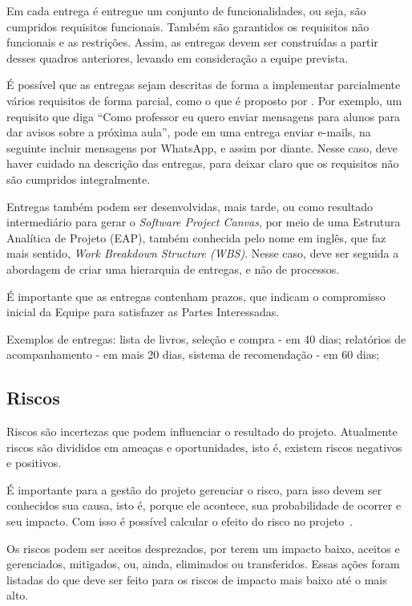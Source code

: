 \documentclass[a4]{report}
\begin{document}
Em cada entrega é entregue um conjunto de funcionalidades, ou seja, são cumpridos requisitos funcionais. Também são garantidos os requisitos não funcionais e as restrições. Assim, as entregas devem ser construídas a partir desses quadros anteriores, levando em consideração a equipe prevista.

É possível que as entregas sejam descritas de forma a implementar parcialmente vários requisitos de forma parcial, como o que é proposto por \citet{jacobson:2011:uc2p0}. Por exemplo, um requisito que diga ``Como professor eu quero enviar mensagens para alunos para dar avisos sobre a próxima aula'', pode em uma entrega enviar e-mails, na seguinte incluir mensagens por WhatsApp, e assim por diante. Nesse caso, deve haver cuidado na descrição das entregas, para deixar claro que os requisitos não são cumpridos integralmente.

Entregas também podem ser desenvolvidas, mais tarde, ou como resultado intermediário para gerar o \textit{Software Project Canvas}, por meio de uma Estrutura Analítica de Projeto (EAP), também conhecida pelo nome em inglês, que faz mais sentido, \textit{Work Breakdown Structure (WBS)}. Nesse caso, deve ser seguida a abordagem de criar uma hierarquia de entregas, e não de processos.

É importante que as entregas contenham prazos, que indicam o compromisso inicial da Equipe para satisfazer as Partes Interessadas.

Exemplos de entregas: lista de livros, seleção e compra - em 40 dias; relatórios de acompanhamento - em mais 20 dias, sistema de recomendação - em 60 dias;

\subsection{Riscos}

Riscos são incertezas que podem influenciar o resultado do projeto. Atualmente riscos são divididos em ameaças e oportunidades, isto é, existem riscos negativos e positivos.

É importante para a gestão do projeto gerenciar o risco, para isso devem ser conhecidos sua causa, isto é, porque ele acontece, sua probabilidade de ocorrer e seu impacto. Com isso é possível calcular o efeito do risco no projeto~\citep{kerzner:12ed,pmbok:6}.

Os riscos podem ser aceitos desprezados, por terem um impacto baixo, aceitos e gerenciados, mitigados, ou, ainda, eliminados ou transferidos. Essas ações foram listadas do que deve ser feito para os riscos de impacto mais baixo até o mais alto.
\end{document}
